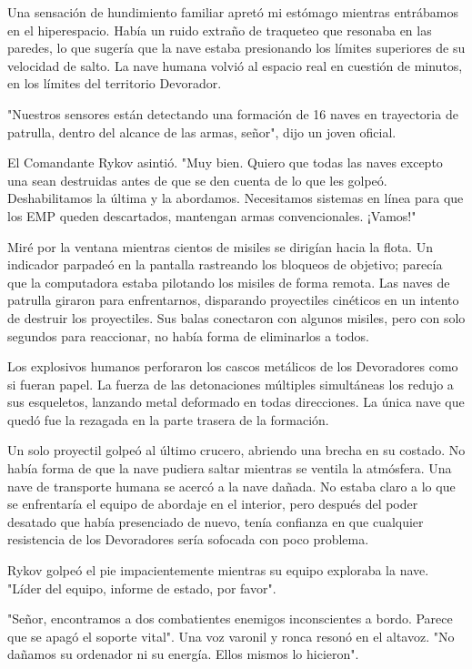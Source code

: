 \documentclass[spanish,12pt,a4paper,oneside,titlepage]{book}
\begin{document}
    Una sensación de hundimiento familiar apretó mi estómago mientras entrábamos en el hiperespacio. Había un ruido extraño de traqueteo que resonaba en las paredes, lo que sugería que la nave estaba presionando los límites superiores de su velocidad de salto. La nave humana volvió al espacio real en cuestión de minutos, en los límites del territorio Devorador.

    "Nuestros sensores están detectando una formación de 16 naves en trayectoria de patrulla, dentro del alcance de las armas, señor", dijo un joven oficial.

    El Comandante Rykov asintió. "Muy bien. Quiero que todas las naves excepto una sean destruidas antes de que se den cuenta de lo que les golpeó. Deshabilitamos la última y la abordamos. Necesitamos sistemas en línea para que los EMP queden descartados, mantengan armas convencionales. ¡Vamos!"

    Miré por la ventana mientras cientos de misiles se dirigían hacia la flota. Un indicador parpadeó en la pantalla rastreando los bloqueos de objetivo; parecía que la computadora estaba pilotando los misiles de forma remota. Las naves de patrulla giraron para enfrentarnos, disparando proyectiles cinéticos en un intento de destruir los proyectiles. Sus balas conectaron con algunos misiles, pero con solo segundos para reaccionar, no había forma de eliminarlos a todos.

    Los explosivos humanos perforaron los cascos metálicos de los Devoradores como si fueran papel. La fuerza de las detonaciones múltiples simultáneas los redujo a sus esqueletos, lanzando metal deformado en todas direcciones. La única nave que quedó fue la rezagada en la parte trasera de la formación.

    Un solo proyectil golpeó al último crucero, abriendo una brecha en su costado. No había forma de que la nave pudiera saltar mientras se ventila la atmósfera. Una nave de transporte humana se acercó a la nave dañada. No estaba claro a lo que se enfrentaría el equipo de abordaje en el interior, pero después del poder desatado que había presenciado de nuevo, tenía confianza en que cualquier resistencia de los Devoradores sería sofocada con poco problema.

    Rykov golpeó el pie impacientemente mientras su equipo exploraba la nave. "Líder del equipo, informe de estado, por favor".

    "Señor, encontramos a dos combatientes enemigos inconscientes a bordo. Parece que se apagó el soporte vital". Una voz varonil y ronca resonó en el altavoz. "No dañamos su ordenador ni su energía. Ellos mismos lo hicieron".
\end{document}
